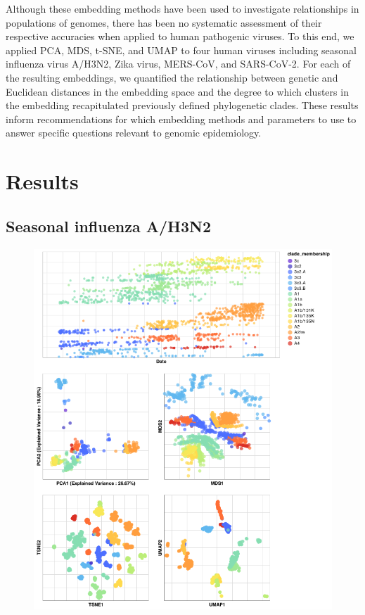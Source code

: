 \documentclass[9pt,lineno]{elife}
\begin{document}
Although these embedding methods have been used to investigate relationships in populations of genomes, there has been no systematic assessment of their respective accuracies when applied to human pathogenic viruses.
To this end, we applied PCA, MDS, t-SNE, and UMAP to four human viruses including seasonal influenza virus A/H3N2, Zika virus, MERS-CoV, and SARS-CoV-2.
For each of the resulting embeddings, we quantified the relationship between genetic and Euclidean distances in the embedding space and the degree to which clusters in the embedding recapitulated previously defined phylogenetic clades.
These results inform recommendations for which embedding methods and parameters to use to answer specific questions relevant to genomic epidemiology.

\section*{Results}

\subsection*{Seasonal influenza A/H3N2}

\begin{figure}[htb]
  \begin{center}
  \includegraphics[width=\columnwidth]{flu-embeddings}
  \caption{
  }
  \label{fig:seasonal-influenza-h3n2-ha-embeddings}
  \end{center}
\end{figure}
\end{document}
